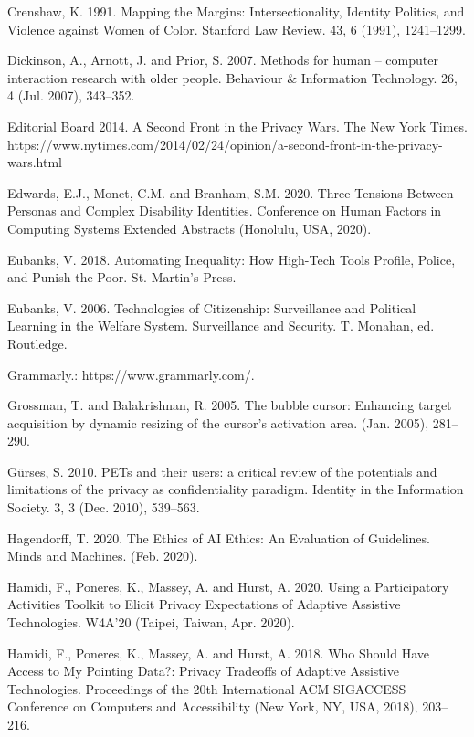 \documentclass[11pt,dvipdfm]{article}
\begin{document}
\begin{thebibliography}{10}
\begin{small}
Crenshaw, K. 1991. Mapping the Margins: Intersectionality, Identity Politics, and Violence against Women of Color. Stanford Law Review. 43, 6 (1991), 1241–1299.

Dickinson, A., Arnott, J. and Prior, S. 2007. Methods for human – computer interaction research with older people. Behaviour \& Information Technology. 26, 4 (Jul. 2007), 343–352. 

Editorial Board 2014. A Second Front in the Privacy Wars. The New York Times. https://www.nytimes.com/2014/02/24/opinion/a-second-front-in-the-privacy-wars.html

Edwards, E.J., Monet, C.M. and Branham, S.M. 2020. Three Tensions Between Personas and Complex Disability Identities. Conference on Human Factors in Computing Systems Extended Abstracts (Honolulu, USA, 2020).

Eubanks, V. 2018. Automating Inequality: How High-Tech Tools Profile, Police, and Punish the Poor. St. Martin’s Press.

Eubanks, V. 2006. Technologies of Citizenship: Surveillance and Political Learning in the Welfare System. Surveillance and Security. T. Monahan, ed. Routledge.

Grammarly.: https://www.grammarly.com/. 

Grossman, T. and Balakrishnan, R. 2005. The bubble cursor: Enhancing target acquisition by dynamic resizing of the cursor’s activation area. (Jan. 2005), 281–290.

Gürses, S. 2010. PETs and their users: a critical review of the potentials and limitations of the privacy as confidentiality paradigm. Identity in the Information Society. 3, 3 (Dec. 2010), 539–563. 

Hagendorff, T. 2020. The Ethics of AI Ethics: An Evaluation of Guidelines. Minds and Machines. (Feb. 2020). 

Hamidi, F., Poneres, K., Massey, A. and Hurst, A. 2020. Using a Participatory Activities Toolkit to Elicit Privacy Expectations of Adaptive Assistive Technologies. W4A’20 (Taipei, Taiwan, Apr. 2020).

Hamidi, F., Poneres, K., Massey, A. and Hurst, A. 2018. Who Should Have Access to My Pointing Data?: Privacy Tradeoffs of Adaptive Assistive Technologies. Proceedings of the 20th International ACM SIGACCESS Conference on Computers and Accessibility (New York, NY, USA, 2018), 203–216.


\end{small}
\end{thebibliography}
\end{document}
